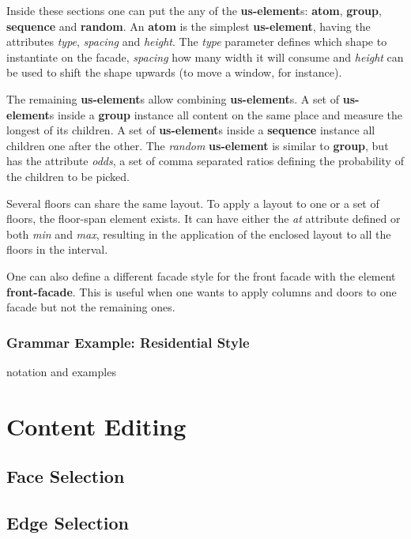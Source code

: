 Inside these sections one can put the any of the \textbf{us-element}s: \textbf{atom}, \textbf{group}, \textbf{sequence} and \textbf{random}.
An \textbf{atom} is the simplest \textbf{us-element}, having the attributes
\emph{type}, \emph{spacing} and \emph{height}.
The \emph{type} parameter defines which shape to instantiate on the facade,
\emph{spacing} how many width it will consume and
\emph{height} can be used to shift the shape upwards (to move a window, for instance).

The remaining \textbf{us-element}s allow combining \textbf{us-element}s.
A set of \textbf{us-element}s inside a \textbf{group} instance all content on the same place and measure the longest of its children.
A set of \textbf{us-element}s inside a \textbf{sequence} instance all children one after the other.
The \emph{random} \textbf{us-element} is similar to \textbf{group}, but has the attribute \emph{odds},
a set of comma separated ratios defining the probability of the children to be picked.

Several floors can share the same layout. To apply a layout to one or a set of floors, the floor-span element exists.
It can have either the \emph{at} attribute defined or both \emph{min} and \emph{max},
resulting in the application of the enclosed layout to all the floors in the interval.

One can also define a different facade style for the front facade with the element \textbf{front-facade}.
This is useful when one wants to apply columns and doors to one facade but not the remaining ones.




%

\subsubsection{Grammar Example: Residential Style}

notation and examples

\section{Content Editing}

\subsection{Face Selection}

\subsection{Edge Selection}

